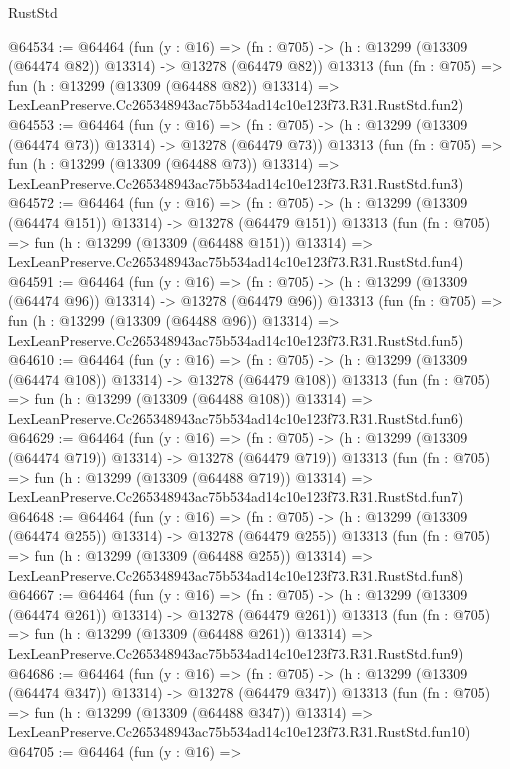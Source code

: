 \begin{lexlean}{RustStd}
\begin{coremodule}
@64534 := @64464
    (fun (y : @16) =>
    (fn : @705) -> (h : @13299 (@13309 (@64474 @82)) @13314) -> @13278 (@64479 @82))
    @13313
    (fun (fn : @705) =>
    fun (h : @13299 (@13309 (@64488 @82)) @13314) =>
    LexLeanPreserve.Cc265348943ac75b534ad14c10e123f73.R31.RustStd.fun2)
@64553 := @64464
    (fun (y : @16) =>
    (fn : @705) -> (h : @13299 (@13309 (@64474 @73)) @13314) -> @13278 (@64479 @73))
    @13313
    (fun (fn : @705) =>
    fun (h : @13299 (@13309 (@64488 @73)) @13314) =>
    LexLeanPreserve.Cc265348943ac75b534ad14c10e123f73.R31.RustStd.fun3)
@64572 := @64464
    (fun (y : @16) =>
    (fn : @705) -> (h : @13299 (@13309 (@64474 @151)) @13314) -> @13278 (@64479 @151))
    @13313
    (fun (fn : @705) =>
    fun (h : @13299 (@13309 (@64488 @151)) @13314) =>
    LexLeanPreserve.Cc265348943ac75b534ad14c10e123f73.R31.RustStd.fun4)
@64591 := @64464
    (fun (y : @16) =>
    (fn : @705) -> (h : @13299 (@13309 (@64474 @96)) @13314) -> @13278 (@64479 @96))
    @13313
    (fun (fn : @705) =>
    fun (h : @13299 (@13309 (@64488 @96)) @13314) =>
    LexLeanPreserve.Cc265348943ac75b534ad14c10e123f73.R31.RustStd.fun5)
@64610 := @64464
    (fun (y : @16) =>
    (fn : @705) -> (h : @13299 (@13309 (@64474 @108)) @13314) -> @13278 (@64479 @108))
    @13313
    (fun (fn : @705) =>
    fun (h : @13299 (@13309 (@64488 @108)) @13314) =>
    LexLeanPreserve.Cc265348943ac75b534ad14c10e123f73.R31.RustStd.fun6)
@64629 := @64464
    (fun (y : @16) =>
    (fn : @705) -> (h : @13299 (@13309 (@64474 @719)) @13314) -> @13278 (@64479 @719))
    @13313
    (fun (fn : @705) =>
    fun (h : @13299 (@13309 (@64488 @719)) @13314) =>
    LexLeanPreserve.Cc265348943ac75b534ad14c10e123f73.R31.RustStd.fun7)
@64648 := @64464
    (fun (y : @16) =>
    (fn : @705) -> (h : @13299 (@13309 (@64474 @255)) @13314) -> @13278 (@64479 @255))
    @13313
    (fun (fn : @705) =>
    fun (h : @13299 (@13309 (@64488 @255)) @13314) =>
    LexLeanPreserve.Cc265348943ac75b534ad14c10e123f73.R31.RustStd.fun8)
@64667 := @64464
    (fun (y : @16) =>
    (fn : @705) -> (h : @13299 (@13309 (@64474 @261)) @13314) -> @13278 (@64479 @261))
    @13313
    (fun (fn : @705) =>
    fun (h : @13299 (@13309 (@64488 @261)) @13314) =>
    LexLeanPreserve.Cc265348943ac75b534ad14c10e123f73.R31.RustStd.fun9)
@64686 := @64464
    (fun (y : @16) =>
    (fn : @705) -> (h : @13299 (@13309 (@64474 @347)) @13314) -> @13278 (@64479 @347))
    @13313
    (fun (fn : @705) =>
    fun (h : @13299 (@13309 (@64488 @347)) @13314) =>
    LexLeanPreserve.Cc265348943ac75b534ad14c10e123f73.R31.RustStd.fun10)
@64705 := @64464
    (fun (y : @16) =>

\end{coremodule}
\end{lexlean}
